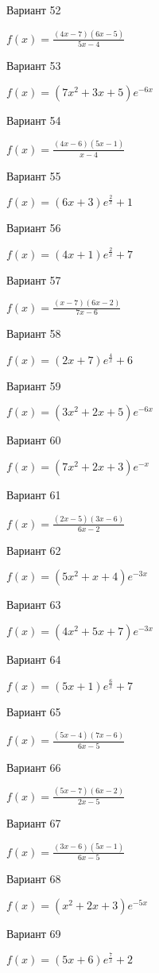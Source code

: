 \documentclass[11pt]{report}
\begin{document}
Вариант 52

$f(x) = \frac{\left(4 x - 7\right) \left(6 x - 5\right)}{5 x - 4}$

Вариант 53

$f(x) = \left(7 x^{2} + 3 x + 5\right) e^{- 6 x}$

Вариант 54

$f(x) = \frac{\left(4 x - 6\right) \left(5 x - 1\right)}{x - 4}$

Вариант 55

$f(x) = \left(6 x + 3\right) e^{\frac{2}{x}} + 1$

Вариант 56

$f(x) = \left(4 x + 1\right) e^{\frac{2}{x}} + 7$

Вариант 57

$f(x) = \frac{\left(x - 7\right) \left(6 x - 2\right)}{7 x - 6}$

Вариант 58

$f(x) = \left(2 x + 7\right) e^{\frac{4}{x}} + 6$

Вариант 59

$f(x) = \left(3 x^{2} + 2 x + 5\right) e^{- 6 x}$

Вариант 60

$f(x) = \left(7 x^{2} + 2 x + 3\right) e^{- x}$

Вариант 61

$f(x) = \frac{\left(2 x - 5\right) \left(3 x - 6\right)}{6 x - 2}$

Вариант 62

$f(x) = \left(5 x^{2} + x + 4\right) e^{- 3 x}$

Вариант 63

$f(x) = \left(4 x^{2} + 5 x + 7\right) e^{- 3 x}$

Вариант 64

$f(x) = \left(5 x + 1\right) e^{\frac{6}{x}} + 7$

Вариант 65

$f(x) = \frac{\left(5 x - 4\right) \left(7 x - 6\right)}{6 x - 5}$

Вариант 66

$f(x) = \frac{\left(5 x - 7\right) \left(6 x - 2\right)}{2 x - 5}$

Вариант 67

$f(x) = \frac{\left(3 x - 6\right) \left(5 x - 1\right)}{6 x - 5}$

Вариант 68

$f(x) = \left(x^{2} + 2 x + 3\right) e^{- 5 x}$

Вариант 69

$f(x) = \left(5 x + 6\right) e^{\frac{7}{x}} + 2$
\end{document}
